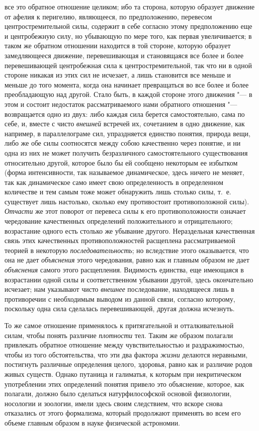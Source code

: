 все это обратное отношение целиком; ибо та сторона, которую образует
движение от афелия к перигелию, являющееся, по предположению, перевесом
центростремительной силы, содержит в себе согласно этому предположению еще
и центробежную силу, но убывающую по мере того, как первая увеличивается; в
таком же обратном отношении находится в той стороне, которую образует
замедляющееся движение, перевешивающая и становящаяся все более и более
перевешивающей центробежная сила к центростремительной, так что ни в одной
стороне никакая из этих сил не исчезает, а лишь становится все меньше и
меньше до того момента, когда она начинает превращаться во все более и
более преобладающую над другой. Стало быть, в каждой стороне этого движения
"--- в этом и состоит недостаток рассматриваемого нами обратного отношения
"--- возвращается одно из двух: либо каждая сила берется самостоятельно, сама
по себе, и, вместе с чисто {\em внешней} встречей их,
сочетанием в одно движение, как например, в параллелограме сил,
упраздняется единство понятия, природа вещи, либо же обе силы соотносятся
между собою качественно через понятие, и ни одна из них не может получить
безразличного самостоятельного существования относительно другой, которое
было бы ей сообщено некоторым ее избытком (форма интенсивности, так
называемое динамическое, здесь ничего не меняет, так как динамическое само
имеет свою определенность в определенном количестве и тем самым тоже может
обнаружить лишь столько силы, т.~е. существует лишь настолько, сколько ему
противостоит противоположной силы). {\em Отчасти} же
этот поворот от перевеса силы к его противоположности означает чередование
качественных определений положительного и отрицательного; возрастание
одного есть столько же убывание другого. Нераздельная качественная связь
этих качественных противоположностей расщеплена рассматриваемой теорией в
некоторую {\em последовательность}; но вследствие этого
оказывается, что она не дает {\em объяснения} этого
чередования, равно как и главным образом не дает
{\em объяснения} самого этого расщепления. Видимость
единства, еще имеющаяся в возрастании одной силы и соответственном убывании
другой, здесь окончательно исчезает; нам указывают чисто
{\em внешнее} последование, находящееся лишь в
противоречии с необходимым выводом из данной связи, согласно которому,
поскольку одна сила сделалась перевешивающей, другая должна исчезнуть.

То же самое отношение применялось к притягательной и отталкивательной силам,
чтобы понять различие {\em плотности} тел. Таким же
образом полагали привлекать обратное отношение между чувствительностью и
раздражимостью, чтобы из того обстоятельства, что эти два фактора
{\em жизни} делаются неравными, постигнуть различные
определения целого, здоровья, равно как и различие родов живых существ.
Однако путаница и галиматья, к которым при некритическом употреблении этих
определений понятия привело это объяснение, которое, как полагали, должно
было сделаться натурфилософской основой физиологии, носологии и зоологии,
имели здесь своим следствием, что вскоре снова отказались от этого
формализма, который продолжают применять во всем его объеме главным образом
в науке физической астрономии.

